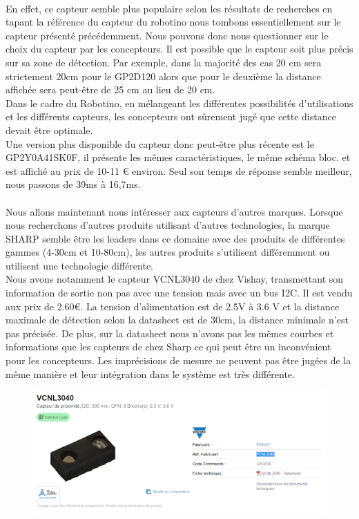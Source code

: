 \documentclass[oneside,a4paper,12pt]{article}
\begin{document}
	\paragraph{}
	En effet, ce capteur semble plus populaire selon les résultats de recherches en tapant la référence du capteur du robotino nous tombons essentiellement sur le capteur présenté précédemment. Nous pouvons donc nous questionner sur le choix du capteur par les concepteurs. Il est possible que le capteur soit plus précis sur sa zone de détection. Par exemple, dans la majorité des cas 20 cm sera strictement 20cm pour le GP2D120 alors que pour le deuxième la distance affichée sera peut-être de 25 cm au lieu de 20 cm.\\
	Dans le cadre du Robotino, en mélangeant les différentes possibilités d'utilisations et les différents capteurs, les concepteurs ont sûrement jugé que cette distance devait être optimale.\\
	Une version plus disponible du capteur donc peut-être plus récente est le GP2Y0A41SK0F, il présente les mêmes caractéristiques, le même schéma bloc. et est affiché au prix de 10-11 € environ. Seul son temps de réponse semble meilleur, nous passons de 39ms à 16,7ms.
	
	\paragraph{}
	
	Nous allons maintenant nous intéresser aux capteurs d’autres marques. 
	Lorsque nous recherchons d’autres produits utilisant d’autres technologies, la marque SHARP semble être les leaders dans ce domaine avec des produits de différentes gammes (4-30cm et 10-80cm), les autres produits s’utilisent différemment ou utilisent une technologie différente.\\
	Nous avons notamment le capteur VCNL3040 de chez Vishay, transmettant son information de sortie non pas avec une tension mais avec un bus I2C. Il est vendu aux prix de 2.60€. La tension d’alimentation est de 2.5V à 3.6 V et la distance maximale de détection selon la datasheet est de 30cm, la distance minimale n’est pas précisée. De plus, sur la datasheet nous n’avons pas les mêmes courbes et informations que les capteurs de chez Sharp ce qui peut être un inconvénient pour les concepteurs. Les imprécisions de mesure ne peuvent pas être jugées de la même manière et leur intégration dans le système est très différente.\\
	\newpage
	\begin{figure}[h]
		\centering
		\includegraphics[width=12cm]{img2.png}
	\end{figure}
\end{document}
